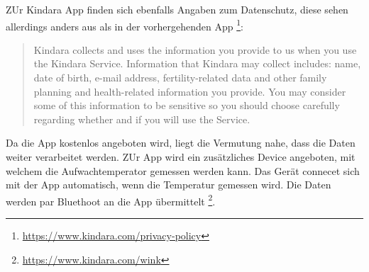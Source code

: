 ZUr Kindara App finden sich ebenfalls Angaben zum Datenschutz, diese sehen allerdings anders aus als in der vorhergehenden App \footnote{\url{https://www.kindara.com/privacy-policy}}:
\begin{quote}
	Kindara collects and uses the information you provide to us when you use the Kindara Service. Information that Kindara may collect includes: name, date of birth, e-mail address, fertility-related data and other family planning and health-related information you provide. You may consider some of this information to be sensitive so you should choose carefully regarding whether and if you will use the Service.
\end{quote}
 Da die App kostenlos angeboten wird, liegt die Vermutung nahe, dass die Daten weiter verarbeitet werden. ZUr App wird ein zusätzliches Device angeboten, mit welchem die Aufwachtemperator gemessen werden kann. Das Gerät connecet sich mit der App automatisch, wenn die Temperatur gemessen wird. Die Daten werden par Bluethoot an die App übermittelt \footnote{\url{https://www.kindara.com/wink}}.

